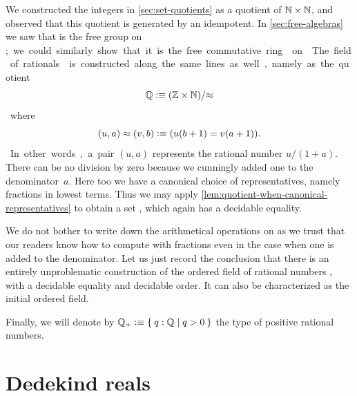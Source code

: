 We constructed the integers \Z in \cref{sec:set-quotients} as a quotient of $\mathbb{N}\times
\mathbb{N}$, and observed that this quotient is generated by an idempotent. In
\cref{sec:free-algebras} we saw that \Z is the free group on \unit; we could similarly
show that it is the free commutative ring on \emptyt. The field of rationals \Q is
constructed along the same lines as well, namely as the quotient
%
\[ \mathbb{Q} \vcentcolon\equiv (\mathbb{Z} \times \mathbb{N})/{\approx} \]
%
where
\[ (u,a) \approx (v,b) \vcentcolon\equiv (u (b + 1) = v (a + 1)). \]
%
In other words, a pair $(u, a)$ represents the rational number $u / (1 + a)$. There can be
no division by zero because we cunningly added one to the denominator~$a$. Here too we
have a canonical choice of representatives, namely fractions in lowest terms. Thus we may
apply \cref{lem:quotient-when-canonical-representatives} to obtain a set \Q, which
again has a decidable equality.
%

We do not bother to write down the arithmetical operations on \Q as we trust that our readers
know how to compute with fractions even in the case when one is added to the denominator.
Let us just record the conclusion that there is an entirely unproblematic construction of
the ordered field of rational numbers \Q, with a decidable equality and decidable order.
It can also be characterized as the initial ordered field.
%

%
%
Finally, we will denote by $\Qp \defeq \setof{ q : \Q | q > 0 }$ the type of positive rational numbers.

\section{Dedekind reals}
\label{sec:dedekind-reals}

